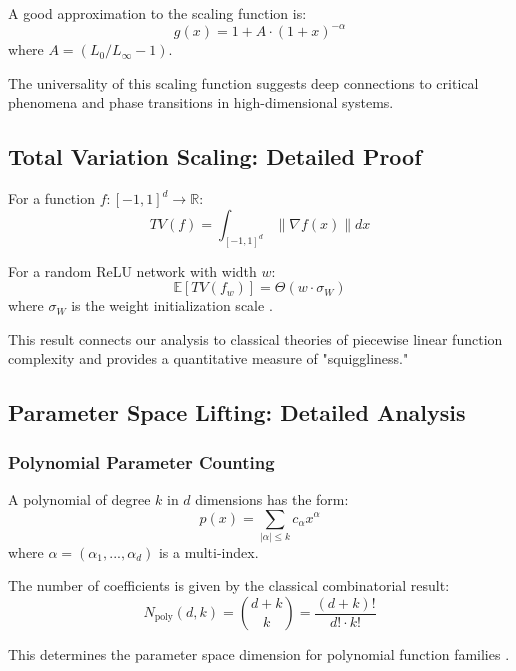 \begin{proposition}
A good approximation to the scaling function is:
$$g(x) = 1 + A \cdot (1 + x)^{-\alpha}$$
where $A = (L_0/L_\infty - 1)$.
\end{proposition}

The universality of this scaling function suggests deep connections to critical phenomena and phase transitions in high-dimensional systems.

\subsection{Total Variation Scaling: Detailed Proof}
\label{subsec:total-variation-proof}

\begin{definition}
For a function $f: [-1,1]^d \to \mathbb{R}$:
$$TV(f) = \int_{[-1,1]^d} \|\nabla f(x)\| dx$$
\end{definition}

\begin{theorem}[TV Scaling]
For a random ReLU network with width $w$:
$$\mathbb{E}[TV(f_w)] = \Theta(w \cdot \sigma_W)$$
where $\sigma_W$ is the weight initialization scale \cite{Glorot2010UnderstandingTD, He2015DelvingDI}.
\end{theorem}

This result connects our analysis to classical theories of piecewise linear function complexity \cite{Arora2016UnderstandingDN} and provides a quantitative measure of "squiggliness."

\subsection{Parameter Space Lifting: Detailed Analysis}
\label{subsec:parameter-lifting-detailed}

\subsubsection{Polynomial Parameter Counting}

A polynomial of degree $k$ in $d$ dimensions has the form:
$$p(x) = \sum_{|\alpha| \leq k} c_\alpha x^\alpha$$
where $\alpha = (\alpha_1, ..., \alpha_d)$ is a multi-index.

The number of coefficients is given by the classical combinatorial result:
$$N_{\text{poly}}(d,k) = \binom{d+k}{k} = \frac{(d+k)!}{d! \cdot k!}$$

This determines the parameter space dimension for polynomial function families \cite{Abramowitz1965HandbookOM}.

